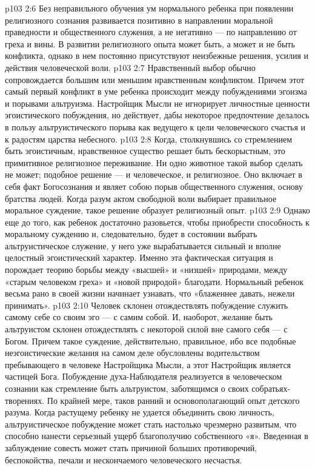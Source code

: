 \vs p103 2:6 Без неправильного обучения ум нормального ребенка при появлении религиозного сознания развивается позитивно в направлении моральной праведности и общественного служения, а не негативно --- по направлению от греха и вины. В развитии религиозного опыта может быть, а может и не быть конфликта, однако в нем постоянно присутствуют неизбежные решения, усилия и действия человеческой воли.
\vs p103 2:7 Нравственный выбор обычно сопровождается большим или меньшим нравственным конфликтом. Причем этот самый первый конфликт в уме ребенка происходит между побуждениями эгоизма и порывами альтруизма. Настройщик Мысли не игнорирует личностные ценности эгоистического побуждения, но действует, дабы некоторое предпочтение делалось в пользу альтруистического порыва как ведущего к цели человеческого счастья и к радостям царства небесного.
\vs p103 2:8 Когда, столкнувшись со стремлением быть эгоистичным, нравственное существо решает быть бескорыстным, это примитивное религиозное переживание. Ни одно животное такой выбор сделать не может; подобное решение --- и человеческое, и религиозное. Оно включает в себя факт Богосознания и являет собою порыв общественного служения, основу братства людей. Когда разум актом свободной воли выбирает правильное моральное суждение, такое решение образует религиозный опыт.
\vs p103 2:9 Однако еще до того, как ребенок достаточно разовьется, чтобы приобрести способность к моральному суждению и, следовательно, будет в состоянии выбрать альтруистическое служение, у него уже вырабатывается сильный и вполне целостный эгоистический характер. Именно эта фактическая ситуация и порождает теорию борьбы между «высшей» и «низшей» природами, между «старым человеком греха» и «новой природой» благодати. Нормальный ребенок весьма рано в своей жизни начинает узнавать, что «блаженнее давать, нежели принимать».
\vs p103 2:10 Человек склонен отождествлять побуждение служить самому себе со своим эго --- с самим собой. И, наоборот, желание быть альтруистом склонен отождествлять с некоторой силой вне самого себя --- с Богом. Причем такое суждение, действительно, правильное, ибо все подобные неэгоистические желания на самом деле обусловлены водительством пребывающего в человеке Настройщика Мысли, а этот Настройщик является частицей Бога. Побуждение духа\hyp{}Наблюдателя реализуется в человеческом сознании как стремление быть альтруистом, заботящимся о своих собратьях\hyp{}творениях. По крайней мере, таков ранний и основополагающий опыт детского разума. Когда растущему ребенку не удается объединить свою личность, альтруистическое побуждение может стать настолько чрезмерно развитым, что способно нанести серьезный ущерб благополучию собственного «я». Введенная в заблуждение совесть может стать причиной больших противоречий, беспокойства, печали и нескончаемого человеческого несчастья.
